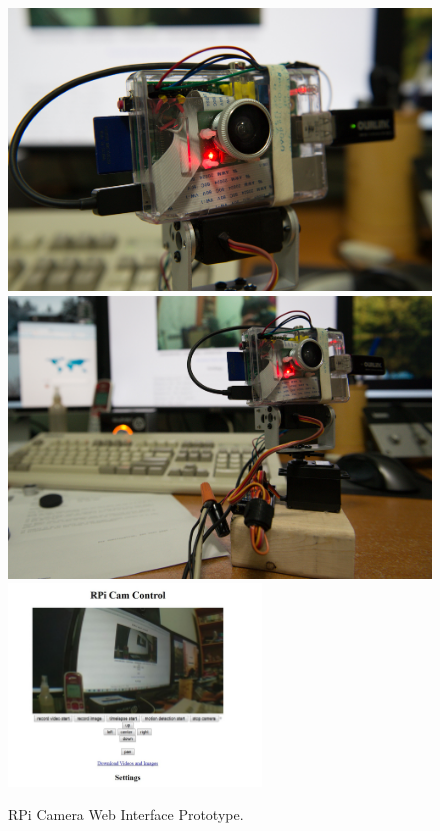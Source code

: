 			\begin{figure}
				\centering
				\caption{RPi Camera Web Interface Prototype.}
				\includegraphics[width=.45\textwidth]{gfx/picam.jpg} \includegraphics[width=.45\textwidth]{gfx/picam2.jpg}
				\includegraphics[width=0.6\textwidth]{gfx/picam3.jpg}
				
				
				\end{figure}
